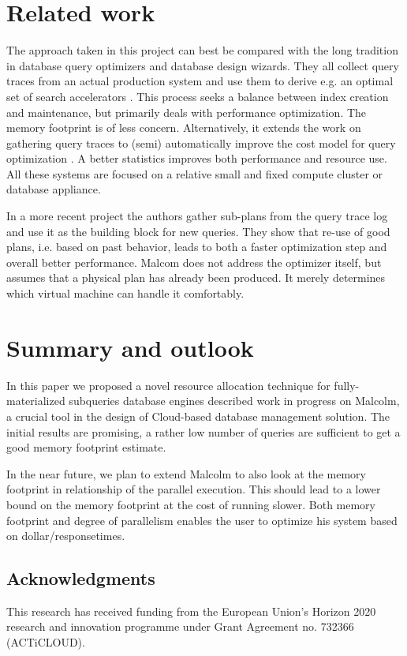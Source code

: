 \documentclass[conference]{IEEEtran}
\begin{document}
\section{Related work}
The approach taken in this project can best be compared with the long tradition in database
query optimizers and database design wizards. They all collect query traces from an actual production system and use them
to derive e.g. an optimal set of search accelerators \cite{DBLP:conf/vldb/ChaudhuriN07}. This process seeks a balance between index creation and maintenance, but primarily deals with
performance optimization. The memory footprint is of less concern.
Alternatively, it extends the work on gathering query traces to (semi) automatically improve the cost model for query
optimization \cite{DBLP:journals/ibmsj/MarklLR03}. A better statistics improves
both performance and resource use.
All these systems are focused on a relative small and fixed compute cluster or database 
appliance.

In a more recent project \cite{DBLP:journals/pvldb/DingDWCN18} the authors gather sub-plans from the 
query trace log and use it as the building block for new queries. They show that
re-use of good plans, i.e. based on past behavior, leads to both a faster optimization
step and overall better performance. Malcom does not address the optimizer itself, but
assumes that a physical plan has already been produced. It merely determines which
virtual machine can handle it comfortably.

\section{Summary and outlook\label{summary}} 
In this paper we proposed a novel resource allocation 
technique for fully-materialized subqueries database
engines
 described work in progress on Malcolm,
a crucial tool in the design of Cloud-based database management solution.
The initial results are promising, a rather low number of queries are
sufficient to get a good memory footprint estimate.

In the near future, we plan to extend Malcolm to also look at the
memory footprint in relationship of the parallel execution. This should
lead to a lower bound on the memory footprint at the cost of running slower.
Both memory footprint and degree of parallelism enables the user to optimize
his system based on dollar/responsetimes.

\subsection*{Acknowledgments} This research has received funding from the European Union’s Horizon 2020 research and innovation programme under Grant Agreement no. 732366 (ACTiCLOUD).


\end{document}
